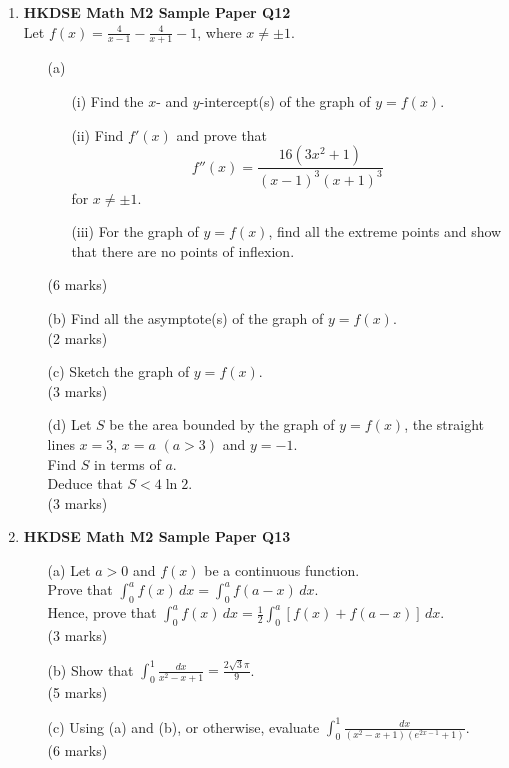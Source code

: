 \documentclass[12pt]{article}
\begin{document}
\begin{enumerate}
	\item \textbf{HKDSE Math M2 Sample Paper Q12}\\
	Let $\displaystyle f(x) = \frac{4}{x-1} - \frac{4}{x+1} -1$, where $x \neq \pm 1$.
	\begin{enumerate}
		\item [(a)]
		\begin{enumerate}
			\item [(i)]Find the $x$- and $y$-intercept(s) of the graph of $y = f(x)$. 
			\item [(ii)]Find $f'(x)$ and prove that 
			$$f''(x) = \displaystyle\frac{16(3x^2 + 1)}{(x-1)^3(x+1)^3}$$
			for $x \neq \pm 1$. 
			\item [(iii)]For the graph of $y = f(x)$, find all the extreme points and show that there are no points of inflexion.
		\end{enumerate}
		(6 marks)
		\item [(b)]Find all the asymptote(s) of the graph of $y = f(x)$. \\(2 marks)
		\item [(c)]Sketch the graph of $y = f(x)$. \\(3 marks)
		\item [(d)]Let $S$ be the area bounded by the graph of $y = f(x)$, the straight lines $x = 3$, $x = a $ $(a > 3)$ and $y = -1$. \\
		Find $S$ in terms of $a$. \\
		Deduce that $S < 4\ln{2}$. \\(3 marks)
  	\end{enumerate}

	\item \textbf{HKDSE Math M2 Sample Paper Q13}
	\begin{enumerate}
		\item[(a)]Let $a > 0$ and $f(x)$ be a continuous function. \\
		Prove that $\displaystyle\int_{0}^a f(x) \,dx = \int_{0}^a f(a-x) \,dx$.\\
		Hence, prove that $\displaystyle\int_{0}^a f(x) \,dx = \frac{1}{2}\int_{0}^a [f(x) + f(a-x)] \,dx$. \\(3 marks)
		\item[(b)]Show that $\displaystyle\int_0^1 \frac{dx}{x^2-x+1} = \frac{2\sqrt{3}\pi}{9}$. \\(5 marks)
		\item[(c)]Using (a) and (b), or otherwise, evaluate $\displaystyle\int _0^1 \frac{dx}{(x^2-x+1)(e^{2x-1}+1)}$. \\(6 marks)
	\end{enumerate}



\end{enumerate}
\end{document}
